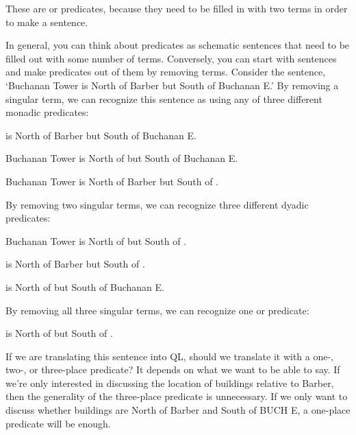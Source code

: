 These are  or  predicates, because they need to be filled in with two terms in order to make a sentence. 

In general, you can think about predicates as schematic sentences that need to be filled out with some number of terms. Conversely, you can start with sentences and make predicates out of them by removing terms. Consider the sentence, `Buchanan Tower is North of Barber but South of Buchanan E.' By removing a singular term, we can recognize this sentence as using any of three different monadic predicates:
\begin{earg}
\item[] \blank is North of Barber but South of Buchanan E.\\
\item[] Buchanan Tower is North of \blank but South of Buchanan E.\\
\item[] Buchanan Tower is North of Barber but South of \blank.
\end{earg}

By removing two singular terms, we can recognize three different dyadic predicates:
\begin{earg}
\item[] Buchanan Tower is North of \blank but South of \blank.\\
\item[] \blank is North of Barber but South of \blank.\\
\item[] \blank is North of \blank but South of Buchanan E.\\
\end{earg}

By removing all three singular terms, we can recognize one  or  predicate:
\begin{center}
\item[] \blank is North of \blank but South of \blank.\\
\end{center}

If we are translating this sentence into QL, should we translate it with a one-, two-, or three-place predicate? It depends on what we want to be able to say. If we're only interested in discussing the location of buildings relative to Barber, then the generality of the three-place predicate is unnecessary. If we only want to discuss whether buildings are North of Barber and South of BUCH E, a one-place predicate will be enough.


